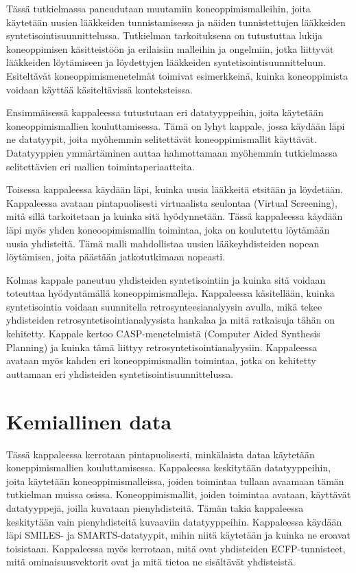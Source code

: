\documentclass[finnish,twoside,censored,tkt,sw-line]{HYthesisML}
\begin{document}
Tässä tutkielmassa paneudutaan muutamiin koneoppimismalleihin, joita käytetään uusien lääkkeiden tunnistamisessa ja näiden tunnistettujen lääkkeiden syntetisointisuunnittelussa.
Tutkielman tarkoituksena on tutustuttaa lukija koneoppimisen käsitteistöön ja erilaisiin malleihin ja ongelmiin, jotka liittyvät lääkkeiden löytämiseen ja löydettyjen lääkkeiden syntetisointisuunnitteluun.
Esiteltävät koneoppimismenetelmät toimivat esimerkkeinä, kuinka koneoppimista voidaan käyttää käsiteltävissä konteksteissa.

Ensimmäisessä kappaleessa tutustutaan eri datatyyppeihin, joita käytetään koneoppimismallien kouluttamisessa.
Tämä on lyhyt kappale, jossa käydään läpi ne datatyypit, joita myöhemmin selitettävät koneoppimismallit käyttävät.
Datatyyppien ymmärtäminen auttaa hahmottamaan myöhemmin tutkielmassa selitettävien eri mallien toimintaperiaatteita.

Toisessa kappaleessa käydään läpi, kuinka uusia lääkkeitä etsitään ja löydetään.
Kappaleessa avataan pintapuolisesti virtuaalista seulontaa (Virtual Screening), mitä sillä tarkoitetaan ja kuinka sitä hyödynnetään.
Tässä kappaleessa käydään läpi myös yhden koneoopimismallin toimintaa, joka on koulutettu löytämään uusia yhdisteitä.
Tämä malli mahdollistaa uusien lääkeyhdisteiden nopean löytämisen, joita päästään jatkotutkimaan nopeasti.

Kolmas kappale paneutuu yhdisteiden syntetisointiin ja kuinka sitä voidaan toteuttaa hyödyntämällä koneoppimismalleja.
Kappaleessa käsitellään, kuinka syntetisointia voidaan suunnitella retrosynteesianalyysin avulla, mikä tekee yhdisteiden retrosyntetisointianalyysista hankalaa ja mitä ratkaisuja tähän on kehitetty.
Kappale kertoo CASP-menetelmistä (Computer Aided Synthesis Planning) ja kuinka tämä liittyy retrosyntetisointianalyysiin.
Kappaleessa avataan myös kahden eri koneoppimismallin toimintaa, jotka on kehitetty auttamaan eri yhdisteiden syntetisointisuunnittelussa.

\chapter{Kemiallinen data}

Tässä kappaleessa kerrotaan pintapuolisesti, minkälaista dataa käytetään koneppimismallien kouluttamisessa.
Kappaleessa keskitytään datatyyppeihin, joita käytetään koneoppimismalleissa, joiden toimintaa tullaan avaamaan tämän tutkielman muissa osissa.
Koneoppimismallit, joiden toimintaa avataan, käyttävät datatyyppejä, joilla kuvataan pienyhdisteitä.
Tämän takia kappaleessa keskitytään vain pienyhdisteitä kuvaaviin datatyyppeihin.
Kappaleessa käydään läpi SMILES- ja SMARTS-datatyypit, mihin niitä käytetään ja kuinka ne eroavat toisistaan.
Kappaleessa myös kerrotaan, mitä ovat yhdisteiden ECFP-tunnisteet, mitä ominaisuusvektorit ovat ja mitä tietoa ne sisältävät yhdisteistä.
\end{document}
